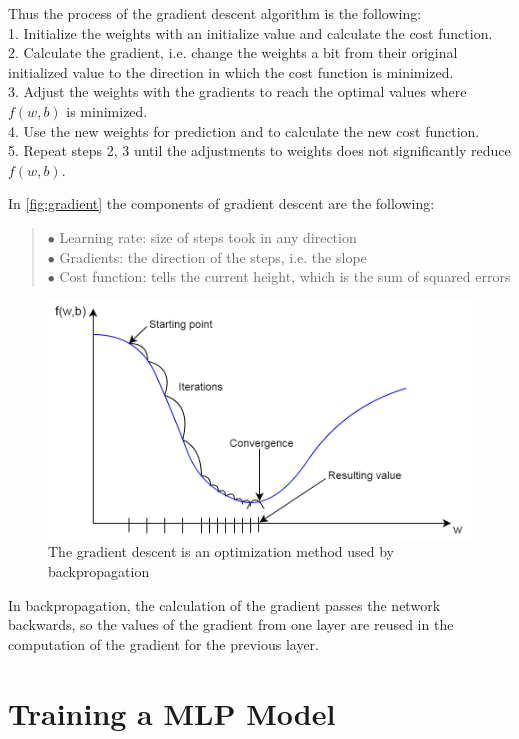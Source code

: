 \noindent Thus the process of the gradient descent algorithm is the following:\\
1. Initialize the weights with an initialize value and calculate the cost function.\\
2. Calculate the gradient, i.e. change the weights a bit from their original initialized value to the direction in which the cost function is minimized.\\
3. Adjust the weights with the gradients to reach the optimal values where $f(w,b)$ is minimized.\\
4. Use the new weights for prediction and to calculate the new cost function.\\
5. Repeat steps 2, 3 until the adjustments to weights does not significantly reduce $f(w,b)$.\bigskip

\noindent In \autoref{fig:gradient} the components of gradient descent are the following:
\begin{verse}
	$\bullet$ Learning rate: size of steps took in any direction\\
	$\bullet$ Gradients: the direction of the steps, i.e. the slope\\
	$\bullet$ Cost function: tells the current height, which is the sum of squared errors
\end{verse}

\begin{figure}[h]
	\centering
	\includegraphics[height=0.4\linewidth]{./figures/gradient}
	\caption{The gradient descent is an optimization method used by backpropagation}
	\label{fig:gradient}
\end{figure}

In backpropagation, the calculation of the gradient passes the network backwards, so the values of the gradient from one layer are reused in the computation of the gradient for the previous layer. 




\section{Training a MLP Model}

